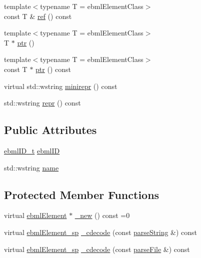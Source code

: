 \begin{DoxyCompactItemize}
\item 
{\footnotesize template$<$typename T  = ebml\+Element\+Class$>$ }\\const T \& \mbox{\hyperlink{classebml_1_1ebmlElementClass_a174c0bdaef3ec9511f30970c7d0827bc}{ref}} () const
\item 
{\footnotesize template$<$typename T  = ebml\+Element\+Class$>$ }\\T $\ast$ \mbox{\hyperlink{classebml_1_1ebmlElementClass_af6901ccaf31aa832687777a0c225abd2}{ptr}} ()
\item 
{\footnotesize template$<$typename T  = ebml\+Element\+Class$>$ }\\const T $\ast$ \mbox{\hyperlink{classebml_1_1ebmlElementClass_ad41af01c63a43d4a629483a2076dcb4e}{ptr}} () const
\item 
virtual std\+::wstring \mbox{\hyperlink{classebml_1_1ebmlElementClass_a251cc751901423a86099d58d49f28291}{minirepr}} () const
\item 
std\+::wstring \mbox{\hyperlink{classebml_1_1ebmlElementClass_a117d6f78c2bdaa4dbf02cab30510d8f5}{repr}} () const
\end{DoxyCompactItemize}
\subsection*{Public Attributes}
\begin{DoxyCompactItemize}
\item 
\mbox{\hyperlink{namespaceebml_a86c5f604ddf12a74aa9812e997a58691}{ebml\+I\+D\+\_\+t}} \mbox{\hyperlink{classebml_1_1ebmlElementClass_a7d8337c9f9b884b43e1618b9392519b6}{ebml\+ID}}
\item 
std\+::wstring \mbox{\hyperlink{classebml_1_1ebmlElementClass_aba4096c056179fb989da05d86f4cb46d}{name}}
\end{DoxyCompactItemize}
\subsection*{Protected Member Functions}
\begin{DoxyCompactItemize}
\item 
virtual \mbox{\hyperlink{classebml_1_1ebmlElement}{ebml\+Element}} $\ast$ \mbox{\hyperlink{classebml_1_1ebmlElementClass_a223ede6b8bc3c85251d2d73f0256fb45}{\+\_\+new}} () const =0
\item 
virtual \mbox{\hyperlink{namespaceebml_adad533b7705a16bb360fe56380c5e7be}{ebml\+Element\+\_\+sp}} \mbox{\hyperlink{classebml_1_1ebmlElementClass_a81f0713cca953599d74185aa24c4c2c1}{\+\_\+cdecode}} (const \mbox{\hyperlink{classebml_1_1parseString}{parse\+String}} \&) const
\item 
virtual \mbox{\hyperlink{namespaceebml_adad533b7705a16bb360fe56380c5e7be}{ebml\+Element\+\_\+sp}} \mbox{\hyperlink{classebml_1_1ebmlElementClass_ae423476637d4ca052cd7aa0047f2b3eb}{\+\_\+cdecode}} (const \mbox{\hyperlink{classebml_1_1parseFile}{parse\+File}} \&) const
\end{DoxyCompactItemize}
